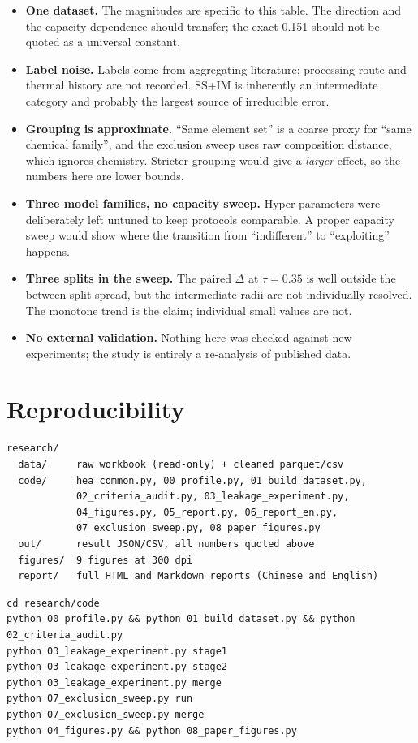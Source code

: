 \documentclass[11pt]{article}
\begin{document}
\begin{itemize}
\item \textbf{One dataset.} The magnitudes are specific to this table. The direction and the capacity dependence should transfer; the exact 0.151 should not be quoted as a universal constant.
\item \textbf{Label noise.} Labels come from aggregating literature; processing route and thermal history are not recorded. SS+IM is inherently an intermediate category and probably the largest source of irreducible error.
\item \textbf{Grouping is approximate.} ``Same element set'' is a coarse proxy for ``same chemical family'', and the exclusion sweep uses raw composition distance, which ignores chemistry. Stricter grouping would give a \emph{larger} effect, so the numbers here are lower bounds.
\item \textbf{Three model families, no capacity sweep.} Hyper-parameters were deliberately left untuned to keep protocols comparable. A proper capacity sweep would show where the transition from ``indifferent'' to ``exploiting'' happens.
\item \textbf{Three splits in the sweep.} The paired $\Delta$ at $\tau = 0.35$ is well outside the between-split spread, but the intermediate radii are not individually resolved. The monotone trend is the claim; individual small values are not.
\item \textbf{No external validation.} Nothing here was checked against new experiments; the study is entirely a re-analysis of published data.
\end{itemize}

\section{Reproducibility}

\begin{verbatim}
research/
  data/     raw workbook (read-only) + cleaned parquet/csv
  code/     hea_common.py, 00_profile.py, 01_build_dataset.py,
            02_criteria_audit.py, 03_leakage_experiment.py,
            04_figures.py, 05_report.py, 06_report_en.py,
            07_exclusion_sweep.py, 08_paper_figures.py
  out/      result JSON/CSV, all numbers quoted above
  figures/  9 figures at 300 dpi
  report/   full HTML and Markdown reports (Chinese and English)
\end{verbatim}

\begin{verbatim}
cd research/code
python 00_profile.py && python 01_build_dataset.py && python 02_criteria_audit.py
python 03_leakage_experiment.py stage1
python 03_leakage_experiment.py stage2
python 03_leakage_experiment.py merge
python 07_exclusion_sweep.py run
python 07_exclusion_sweep.py merge
python 04_figures.py && python 08_paper_figures.py
\end{verbatim}
\end{document}
